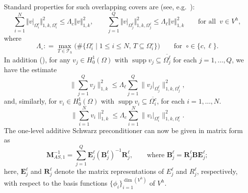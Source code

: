 \documentclass[numbers,webpdf,imaiai]{ima-authoring-template}%
\theoremstyle{thmstyletwo}%
\numberwithin{equation}{section}
\newcommand{\assign}{\mathrel{\mathop:}=}
\numberwithin{equation}{section}
\DeclareMathOperator{\supp}{supp}
\begin{document}
{Standard properties for such overlapping covers are (see, e.g.\ \cite[eq.~(2.10)]{Graham:2020:DDI}):
\begin{equation} 
	\sum_{i=1}^N \Vert v \vert_{\Omega_i^c} \Vert_{1,k,\Omega_i^c}^2 \leq \Lambda_c \Vert v \Vert_{1,k}^2 , 
	\qquad
	\sum_{j=1}^Q \Vert v\vert_{\Omega_j^\ell} \Vert_{1,k,\Omega_j^\ell}^2 \leq \Lambda_\ell \Vert v \Vert_{1,k}^2 
	\qquad \text{for all} \;\; v \in V^h,
	\label{overlap}
\end{equation}
where
\begin{equation}\label{Lambda_l_c}
	\Lambda_\circ \assign \max_{T\in\mathcal{T}_h}\bigl(\#\bigl\{\Omega^\circ_i \mid 1 \le i \le N,\, T \subseteq \Omega^\circ_i\bigr\} \bigr) 
	\qquad \text{for} \;\;  \circ \in \{c,\ell\}.
\end{equation}
In addition (\cite[Lemma 3.6]{Graham:2020:DDI}), for any  $v_j \in H^1_0(\Omega)$ with
$\supp v_j \subseteq \overline{\Omega_j^\ell}$ for each $j = 1, \ldots, Q$, we have the estimate 
\begin{equation}\label{overlap1}
	\bigg\| \sum_{j=1}^Q v_j \bigg\|_{1,k}^2  \le \Lambda_\ell \sum_{j=1}^Q \|v_j|_{\Omega_j^\ell}\|_{1,k,\Omega_j^\ell}^2,
\end{equation}
and, similarly, for  $v_i \in H_0^1(\Omega)$ with $\supp v_i \subseteq \overline{\Omega_i^c}$, for each $i=1,\ldots,N$.
\begin{equation}\label{overlap2}
	\bigg\| \sum_{i=1}^N v_i \bigg\|_{1,k}^2  \le \Lambda_c \sum_{i=1}^N \|v_i|_{\Omega_i^c}\|_{1,k,\Omega_i^c}^2 .
\end{equation}
The one-level additive Schwarz preconditioner can now be given in matrix form as 
\begin{equation}
  \label{one_level}
	\mathbf{M}^{-1}_{AS,1} = \sum_{j=1}^{Q} \mathbf{E}^{\ell}_j (\mathbf{B}^{\ell}_j)^{-1} \mathbf{R}^{\ell}_j, \qquad 
	\text{where } \mathbf{B}^{\ell}_j = \mathbf{R}^{\ell}_j \mathbf{B} \mathbf{E}^{\ell}_j;
\end{equation}
here, $\mathbf{E}^{\ell}_j$ and $\mathbf{R}^{\ell}_j$ denote the matrix representations 
of \(E_j^\ell\) and \(R_j^\ell\), respectively, with respect to the 
basis functions $\lbrace \phi_i \rbrace_{i=1}^{\dim(V^h)}$ of $V^h$. 
 
}
\end{document}
